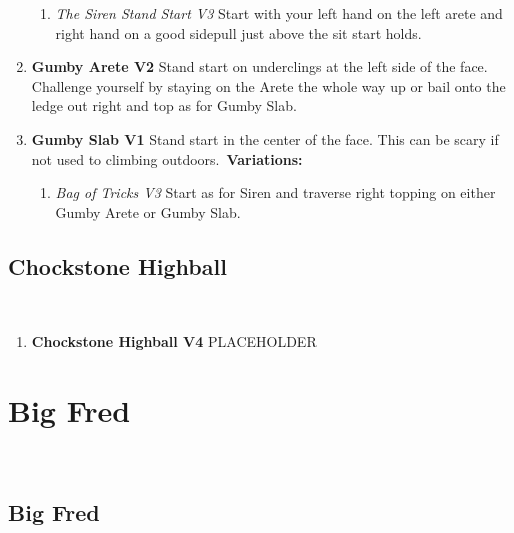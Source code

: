\begin{enumerate}[resume]
\begin{enumerate}
		\item\label{vr:The Siren Stand Start} \colorbox{green!20}{\emph{The Siren Stand Start V3 \ding{72}    }  }
		\newline Start with your left hand on the left arete and right hand on a good sidepull just above the sit start holds.\
	\end{enumerate}
	\item\label{rt:Gumby Arete} \colorbox{green!20}{\textbf{Gumby Arete V2     } }
	\newline Stand start on underclings at the left side of the face. Challenge yourself by staying on the Arete the whole way up or bail onto the ledge out right and top as for Gumby Slab.\
	\item\label{rt:Gumby Slab} \colorbox{green!20}{\textbf{Gumby Slab V1      } }
	\newline Stand start in the center of the face. This can be scary if not used to climbing outdoors.\
	\newline \textbf{Variations:}
	\begin{enumerate}
		\item\label{vr:Bag of Tricks} \colorbox{green!20}{\emph{Bag of Tricks V3 \ding{72} \ding{72}  }  }
		\newline Start as for Siren and traverse right topping on either Gumby Arete or Gumby Slab.\
	\end{enumerate}
\end{enumerate}
\subsection*{Chockstone Highball}\label{bf:Chockstone Highball}
\

\begin{enumerate}[resume]
	\item\label{rt:Chockstone Highball} \colorbox{RoyalBlue!20}{\textbf{Chockstone Highball V4  } }
	\newline PLACEHOLDER\
\end{enumerate}
\section{Big Fred}\label{sa:Big Fred}
\

\subsection*{Big Fred}\label{bf:Big Fred}
\

